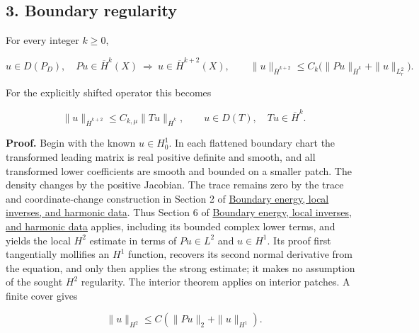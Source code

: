 \documentclass[
  11pt,
]{article}
\makeatletter
\let\ReaderOriginalAnchorStart\hyper@anchorstart
\let\ReaderOriginalAnchorEnd\hyper@anchorend
\let\ReaderPendingAliases\@empty
\def\ReaderArmAliases#1{\gdef\ReaderPendingAliases{#1}}
\def\hyper@anchorstart#1{\ReaderIfNativeAnchorTF{#1}{\ReaderPendingAliases\global\let\ReaderPendingAliases\@empty}{}\ReaderOriginalAnchorStart{#1}}
\makeatother
\begin{document}
\ReaderArmAliases{\ReaderOriginalAnchorStart{AN03-DSP-003}\ReaderOriginalAnchorEnd\begingroup\expandafter\def\csname @currentHref\endcsname{AN03-DSP-003}\label{AN03-DSP-003}\endgroup\ReaderOriginalAnchorStart{an03-dsp-003-boundary-regularity}\ReaderOriginalAnchorEnd\begingroup\expandafter\def\csname @currentHref\endcsname{an03-dsp-003-boundary-regularity}\label{an03-dsp-003-boundary-regularity}\endgroup\ReaderOriginalAnchorStart{3-boundary-regularity}\ReaderOriginalAnchorEnd\begingroup\expandafter\def\csname @currentHref\endcsname{3-boundary-regularity}\label{3-boundary-regularity}\endgroup\ReaderOriginalAnchorStart{boundary-regularity}\ReaderOriginalAnchorEnd}
\subsection{3. Boundary regularity}\label{boundary-regularity}

For every integer \(k\geq0\),

\[
 u\in D(P_D),\quad Pu\in\overline H^k(X)
 \ \Longrightarrow\ u\in\overline H^{k+2}(X),
 \qquad
 \|u\|_{\overline H^{k+2}}\leq C_k\bigl(\|Pu\|_{\overline H^k}+\|u\|_{L^2_r}\bigr).
 \tag{DSP8}
\]

For the explicitly shifted operator this becomes

\[
 \|u\|_{\overline H^{k+2}}\leq C_{k,\mu}\|Tu\|_{\overline H^k},
 \qquad u\in D(T),\quad Tu\in\overline H^k.
 \tag{DSP9}
\]

\textbf{Proof.} Begin with the known \(u\in H_0^1\). In each flattened
boundary chart the transformed leading matrix is real positive definite
and smooth, and all transformed lower coefficients are smooth and
bounded on a smaller patch. The density changes by the positive
Jacobian. The trace remains zero by the trace and coordinate-change
construction in Section 2 of \href{second-order-boundary.pdf}{Boundary
energy, local inverses, and harmonic data}. Thus Section 6 of
\href{second-order-boundary.pdf}{Boundary energy, local inverses, and
harmonic data} applies, including its bounded complex lower terms, and
yields the local \(H^2\) estimate in terms of \(Pu\in L^2\) and
\(u\in H^1\). Its proof first tangentially mollifies an \(H^1\)
function, recovers its second normal derivative from the equation, and
only then applies the strong estimate; it makes no assumption of the
sought \(H^2\) regularity. The interior theorem applies on interior
patches. A finite cover gives

\[
 \|u\|_{H^2}\leq C(\|Pu\|_2+\|u\|_{H^1}).
\]
\end{document}
